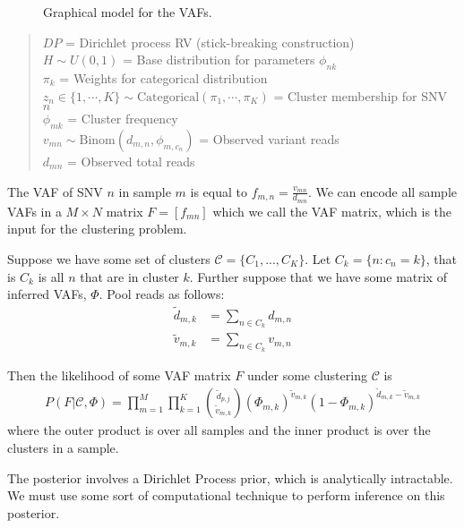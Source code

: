 \documentclass[11pt]{article}
\newcommand{\adjustimg}{%
  \checkoddpage%
  \ifoddpage\hspace*{\dimexpr\evensidemargin-\oddsidemargin}\else\hspace*{-\dimexpr\evensidemargin-\oddsidemargin}\fi%
}
\newcommand{\centerimg}[2][width=\textwidth]{%
  \makebox[\textwidth]{\adjustimg\texttt{[image: \#2]}}%
}
\begin{document}
\begin{figure}[H]
\centerimg[scale=1.0]{multi_pgm.png}
\caption{Graphical model for the VAFs.}
\label{fig:GM}
\end{figure}

\begin{quote}
$DP$ = Dirichlet process RV (stick-breaking construction) \\
$H \sim U(0,1)$ = Base distribution for parameters $\phi_{nk}$	 \\
$\pi_k$ = Weights for categorical distribution \\
$z_{n} \in \{1, \cdots, K\}  \sim \mathrm{Categorical}(\pi_1, \cdots, \pi_K)$ =  Cluster membership for SNV $n$\\
$\phi_{mk}$ = Cluster frequency \\ 
$v_{mn} \sim \mathrm{Binom}(d_{m,n}, \phi_{m,c_n})$ = Observed variant reads\\ 
$d_{mn}$ = Observed total reads
\end{quote}

The VAF of SNV $n$ in sample $m$ is equal to $f_{m,n} = \frac{v_{mn}}{d_{mn}}$. We can encode all sample VAFs in a $M \times N$ matrix $F = [f_{mn}]$ which we call the VAF matrix, which is the input for the clustering problem.

\newpage

Suppose we have some set of clusters $\mathcal{C}=\{C_1, ..., C_K\}$. Let $C_k = \{n: c_n = k\}$, that is $C_k$ is all $n$ that are in cluster $k$. Further suppose that we have some matrix of inferred VAFs, $\Phi$. Pool reads as follows:
\begin{align}
\widetilde{d}_{m,k} &= \sum\limits_{n \in C_k} d_{m,n} \\
\widetilde{v}_{m,k} &= \sum\limits_{n \in C_k} v_{m,n}
\end{align}

Then the likelihood of some VAF matrix $F$  under some clustering $\mathcal{C}$ is
\begin{align}
P(F|\mathcal{C}, \Phi) = \prod\limits_{m=1}^M \prod\limits_{k=1}^K\binom{\widetilde{d}_{p,j}}{\widetilde{v}_{m,k}} \left({\Phi}_{m,k}\right)^{\widetilde{v}_{m,k}} \left(1 - \Phi_{m,k}\right)^{\widetilde{d}_{m,k} - \widetilde{v}_{m,k}}
\end{align}
where the outer product is over all samples and the inner product is over the clusters in a sample.

The posterior involves a Dirichlet Process prior, which is analytically intractable. We must use some sort of computational technique to perform inference on this posterior.
\end{document}
